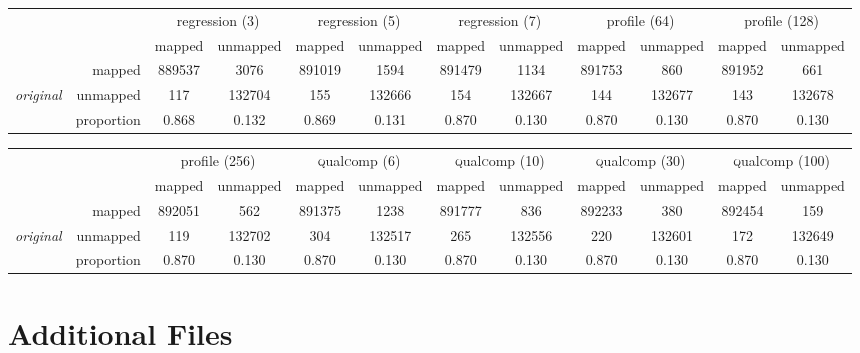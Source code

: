 \documentclass{bmcart}
\begin{document}
\begin{backmatter}
\begin{table*}[!tbhp]
\begin{tiny}
\bigskip

\begin{tabular}{lr|cc|cc|cc|cc|cc}
 & & \multicolumn{2}{c|}{regression (3)} & \multicolumn{2}{c|}{regression (5)} & \multicolumn{2}{c|}{regression (7)} & \multicolumn{2}{c|}{profile (64)} & \multicolumn{2}{c}{profile (128)} \\
& & mapped & unmapped & mapped & unmapped & mapped & unmapped & mapped & unmapped & mapped & unmapped \\
\cline{2-12}
& mapped & 889537 & 3076 & 891019 & 1594 & 891479 & 1134 & 891753 & 860 & 891952 & 661 \\
{\em original} & unmapped & 117 & 132704 & 155 & 132666 & 154 & 132667 & 144 & 132677 & 143 & 132678 \\
\cline{2-12}
& proportion & 0.868 & 0.132 & 0.869 & 0.131 & 0.870 & 0.130 & 0.870 & 0.130 & 0.870 & 0.130 \\
\end{tabular}

\bigskip

\begin{tabular}{lr|cc|cc|cc|cc|cc}
&  & \multicolumn{2}{c|}{profile (256)} & \multicolumn{2}{c|}{\textsc{q}ual\textsc{c}omp (6)} & \multicolumn{2}{c|}{\textsc{q}ual\textsc{c}omp (10)} & \multicolumn{2}{c|}{\textsc{q}ual\textsc{c}omp (30)} & \multicolumn{2}{c}{\textsc{q}ual\textsc{c}omp (100)} \\
& &  mapped & unmapped & mapped & unmapped & mapped & unmapped & mapped & unmapped & mapped & unmapped \\
\cline{2-12}
& mapped & 892051 & 562 & 891375 & 1238 & 891777 & 836 & 892233 & 380 & 892454 & 159 \\
{\em original}  & unmapped & 119 & 132702 & 304 & 132517 & 265 & 132556 & 220 & 132601 & 172 & 132649 \\
\cline{2-12}
& proportion & 0.870 & 0.130 & 0.870 & 0.130 & 0.870 & 0.130 & 0.870 & 0.130 & 0.870 & 0.130 \\
\end{tabular}
\end{tiny}

\label{tab:aligner}
\end{table*}



\section*{Additional Files}

\end{backmatter}
\end{document}
